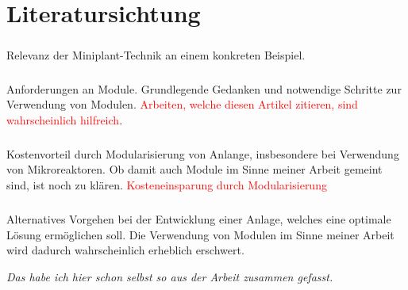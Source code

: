 \chapter{Literatursichtung}\label{ch:lit}
\paragraph*{\cite{Behr_2012}} Relevanz der Miniplant-Technik an einem konkreten Beispiel.

\paragraph*{\cite{Bramsiepe_2012}} Anforderungen an Module. Grundlegende Gedanken und notwendige Schritte zur Verwendung von Modulen. \textcolor{red}{Arbeiten, welche diesen Artikel zitieren, sind wahrscheinlich hilfreich}.

\paragraph*{\cite{Brodhagen_2012}} Kostenvorteil durch Modularisierung von Anlange, insbesondere bei Verwendung von Mikroreaktoren. Ob damit auch Module im Sinne meiner Arbeit gemeint sind, ist noch zu kl\"aren. \textcolor{red}{Kosteneinsparung durch Modularisierung}

\paragraph*{\cite{Dietz2000}} Alternatives Vorgehen bei der Entwicklung einer Anlage, welches eine optimale L\"osung erm\"oglichen soll. Die Verwendung von Modulen im Sinne meiner Arbeit wird dadurch wahrscheinlich erheblich erschwert. \hfill \newline

\textit{Das habe ich hier schon selbst so aus der Arbeit zusammen gefasst.} \hfill \newline

